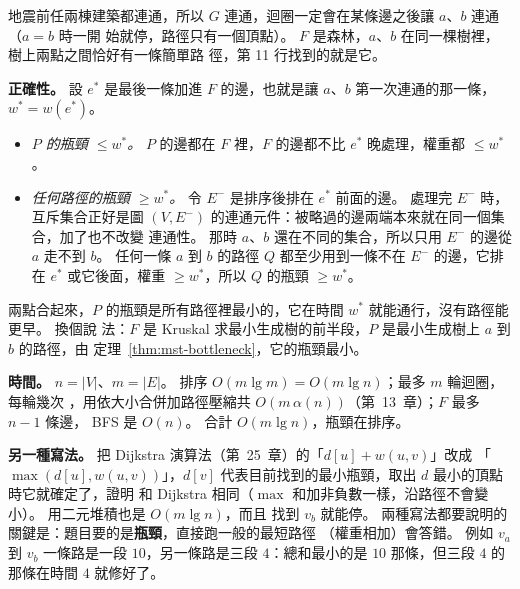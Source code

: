 地震前任兩棟建築都連通，所以 $G$ 連通，迴圈一定會在某條邊之後讓 $a$、$b$ 連通（$a = b$ 時一開
始就停，路徑只有一個頂點）。 $F$ 是森林，$a$、$b$ 在同一棵樹裡，樹上兩點之間恰好有一條簡單路
徑，第 11 行找到的就是它。

\textbf{正確性。} 設 $e^{*}$ 是最後一條加進 $F$ 的邊，也就是讓 $a$、$b$ 第一次連通的那一條，
$w^{*} = w(e^{*})$。
\begin{itemize}
\item \emph{$P$ 的瓶頸 $\le w^{*}$。} $P$ 的邊都在 $F$ 裡，$F$ 的邊都不比 $e^{*}$ 晚處理，權重都
$\le w^{*}$。
\item \emph{任何路徑的瓶頸 $\ge w^{*}$。} 令 $E^{-}$ 是排序後排在 $e^{*}$ 前面的邊。 處理完 $E^{-}$
時，互斥集合正好是圖 $(V, E^{-})$ 的連通元件：被略過的邊兩端本來就在同一個集合，加了也不改變
連通性。 那時 $a$、$b$ 還在不同的集合，所以只用 $E^{-}$ 的邊從 $a$ 走不到 $b$。 任何一條 $a$ 到
$b$ 的路徑 $Q$ 都至少用到一條不在 $E^{-}$ 的邊，它排在 $e^{*}$ 或它後面，權重 $\ge w^{*}$，所以
$Q$ 的瓶頸 $\ge w^{*}$。
\end{itemize}
兩點合起來，$P$ 的瓶頸是所有路徑裡最小的，它在時間 $w^{*}$ 就能通行，沒有路徑能更早。 換個說
法：$F$ 是 Kruskal 求最小生成樹的前半段，$P$ 是最小生成樹上 $a$ 到 $b$ 的路徑，由
定理~\ref{thm:mst-bottleneck}，它的瓶頸最小。

\textbf{時間。} $n = |V|$、$m = |E|$。 排序 $O(m \lg m) = O(m \lg n)$；最多 $m$ 輪迴圈，每輪幾次
，用依大小合併加路徑壓縮共 $O(m\,\alpha(n))$（第~13~章）；$F$ 最多 $n - 1$ 條邊，
BFS 是 $O(n)$。 合計 $O(m \lg n)$，瓶頸在排序。

\textbf{另一種寫法。} 把 Dijkstra 演算法（第~25~章）的「$d[u] + w(u, v)$」改成
「$\max(d[u], w(u, v))$」，$d[v]$ 代表目前找到的最小瓶頸，取出 $d$ 最小的頂點時它就確定了，證明
和 Dijkstra 相同（$\max$ 和加非負數一樣，沿路徑不會變小）。 用二元堆積也是 $O(m \lg n)$，而且
找到 $v_b$ 就能停。 兩種寫法都要說明的關鍵是：題目要的是\textbf{瓶頸}，直接跑一般的最短路徑
（權重相加）會答錯。 例如 $v_a$ 到 $v_b$ 一條路是一段 $10$，另一條路是三段 $4$：總和最小的是
$10$ 那條，但三段 $4$ 的那條在時間 $4$ 就修好了。
